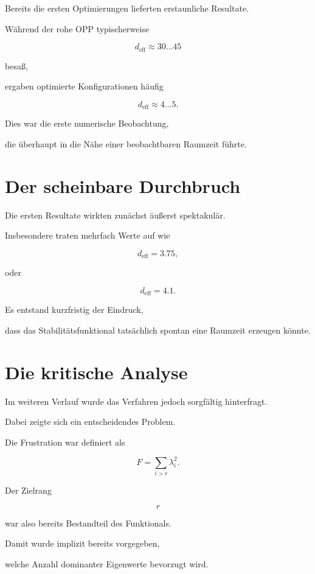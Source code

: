 Bereits die ersten Optimierungen lieferten erstaunliche Resultate.

Während der rohe OPP typischerweise

\[
d_{\mathrm{eff}}
\approx
30\ldots45
\]

besaß,

ergaben optimierte Konfigurationen häufig

\[
d_{\mathrm{eff}}
\approx
4\ldots5.
\]

Dies war die erste numerische Beobachtung,

die überhaupt in die Nähe einer beobachtbaren Raumzeit führte.


\section*{Der scheinbare Durchbruch}

Die ersten Resultate wirkten zunächst äußerst spektakulär.

Insbesondere traten mehrfach Werte auf wie

\[
d_{\mathrm{eff}}
=
3.75,
\]

oder

\[
d_{\mathrm{eff}}
=
4.1.
\]

Es entstand kurzfristig der Eindruck,

dass das Stabilitätsfunktional tatsächlich spontan eine Raumzeit erzeugen könnte.


\section*{Die kritische Analyse}

Im weiteren Verlauf wurde das Verfahren jedoch sorgfältig hinterfragt.

Dabei zeigte sich ein entscheidendes Problem.

Die Frustration war definiert als

\[
F
=
\sum_{i>r}
\lambda_i^2.
\]

Der Zielrang

\[
r
\]

war also bereits Bestandteil des Funktionals.

Damit wurde implizit bereits vorgegeben,

welche Anzahl dominanter Eigenwerte bevorzugt wird.

